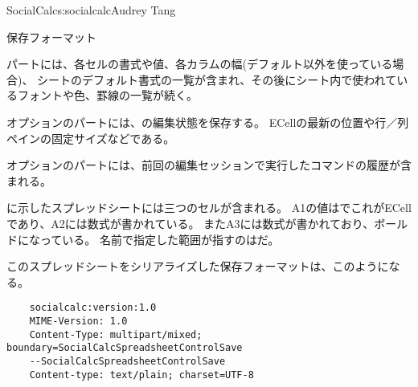 \begin{aosachapter}{SocialCalc}{s:socialcalc}{Audrey Tang}
\begin{aosasect1}{保存フォーマット}
\begin{aosaitemize}
  \item {}パートには、各セルの書式や値、各カラムの幅(デフォルト以外を使っている場合)、
  シートのデフォルト書式の一覧が含まれ、その後にシート内で使われているフォントや色、罫線の一覧が続く。

  \item オプションのパートには、の編集状態を保存する。
  ECellの最新の位置や行／列ペインの固定サイズなどである。

  \item オプションのパートには、前回の編集セッションで実行したコマンドの履歴が含まれる。

\end{aosaitemize}

に示したスプレッドシートには三つのセルが含まれる。
A1の値はでこれがECellであり、A2には数式が書かれている。
またA3には数式が書かれており、ボールドになっている。
名前で指定した範囲が指すのはだ。


このスプレッドシートをシリアライズした保存フォーマットは、このようになる。

\begin{verbatim}
    socialcalc:version:1.0
    MIME-Version: 1.0
    Content-Type: multipart/mixed; boundary=SocialCalcSpreadsheetControlSave
    --SocialCalcSpreadsheetControlSave
    Content-type: text/plain; charset=UTF-8


\end{verbatim}
\end{aosasect1}
\end{aosachapter}
